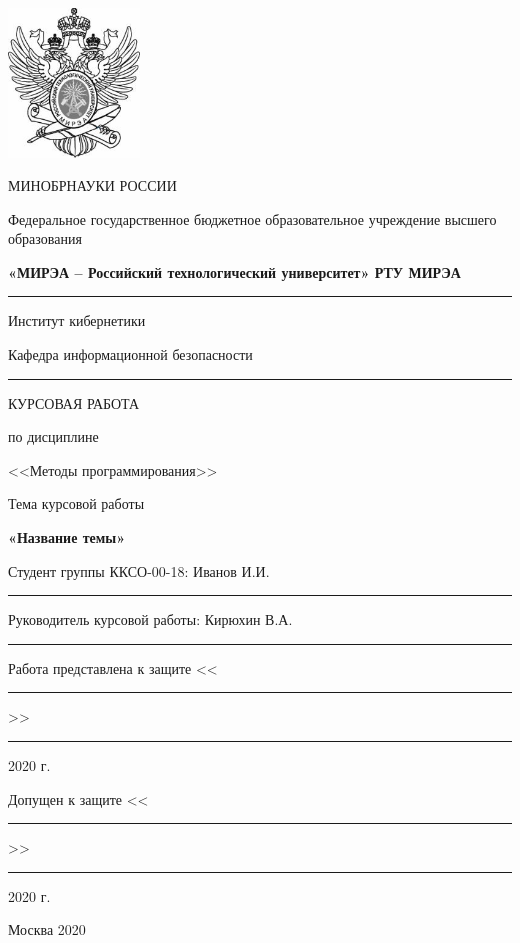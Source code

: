 \begin{center}
\thispagestyle{empty} 

\begin{spacing}{1}

\includegraphics[width=35mm]{logo.jpg} 

{

{МИНОБРНАУКИ РОССИИ}

{Федеральное государственное бюджетное образовательное \linebreak учреждение высшего образования}

{
{\bf «МИРЭА – Российский технологический университет» \linebreak РТУ МИРЭА}
}
\rule{1\columnwidth}{1pt}
{Институт кибернетики \smallskip}

{Кафедра информационной безопасности}
\rule{1\columnwidth}{1pt}

}

\end{spacing}

\vspace{1.5cm}

{
КУРСОВАЯ РАБОТА

по дисциплине

<<Методы программирования>>
}

\vspace{0.5cm}

{
Тема курсовой работы

\large\bf
«Название темы»
}

\vspace{1.5cm}

\begin{flushleft}
Студент группы ККСО-00-18: Иванов И.И. \rule{4cm}{0.5pt}

\vspace{1cm}

Руководитель курсовой работы: Кирюхин В.А. \rule{4cm}{0.5pt}

\vspace{1cm}

Работа представлена к защите <<\rule{1cm}{0.5pt}>> \rule{2cm}{0.5pt} 2020 г.

\vspace{1cm}

Допущен к защите <<\rule{1cm}{0.5pt}>> \rule{2cm}{0.5pt} 2020 г.
\end{flushleft}


\vspace{1.5cm}

{Москва 2020}

\end{center}
